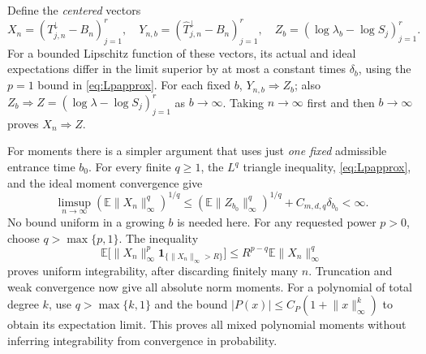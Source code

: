 \documentclass[11pt]{article}
\theoremstyle{remark}\newtheorem{remark}[theorem]{Remark}
\newcommand{\Ebb}{\mathbb E}
\newcommand{\one}{\mathbf 1}
\newcommand{\norm}[1]{\lVert #1\rVert}
\begin{document}
Define the \emph{centered} vectors
\[
 X_n=(T_{j,n}^{\downarrow}-B_n)_{j=1}^r,\quad
 Y_{n,b}=(\widehat T_{j,n}^{\downarrow}-B_n)_{j=1}^r,\quad
 Z_b=(\log\lambda_b-\log S_j)_{j=1}^r.
\]
For a bounded Lipschitz function of these vectors, its actual and ideal
expectations differ in the limit superior by at most a constant times
$\delta_b$, using the $p=1$ bound in \eqref{eq:Lpapprox}. For each fixed $b$,
$Y_{n,b}\Rightarrow Z_b$; also $Z_b\Rightarrow
Z=(\log\lambda-\log S_j)_{j=1}^r$ as $b\to\infty$.
Taking $n\to\infty$ first and then $b\to\infty$ proves $X_n\Rightarrow Z$.

For moments there is a simpler argument that uses just \emph{one fixed}
admissible entrance time $b_0$. For every finite $q\ge1$, the $L^q$
triangle inequality, \eqref{eq:Lpapprox}, and the ideal moment convergence
give
\begin{equation}\label{eq:centeredmoments}
 \limsup_{n\to\infty}
       (\Ebb\norm{X_n}_\infty^q)^{1/q}
 \le (\Ebb\norm{Z_{b_0}}_\infty^q)^{1/q}
       +C_{m,d,q}\delta_{b_0}<\infty.
\end{equation}
No bound uniform in a growing $b$ is needed here. For any requested power
$p>0$, choose $q>\max\{p,1\}$. The inequality
\[
 \Ebb\bigl[\norm{X_n}_\infty^p
         \one_{\{\norm{X_n}_\infty>R\}}\bigr]
 \le R^{p-q}\Ebb\norm{X_n}_\infty^q
\]
proves uniform integrability, after discarding finitely many $n$.
Truncation and weak convergence now give all absolute norm moments.
For a polynomial of total degree $k$, use $q>\max\{k,1\}$ and the bound
$|P(x)|\le C_P(1+\norm{x}_\infty^k)$ to obtain its expectation limit.
This proves all mixed polynomial moments without inferring integrability
from convergence in probability.
\end{document}
